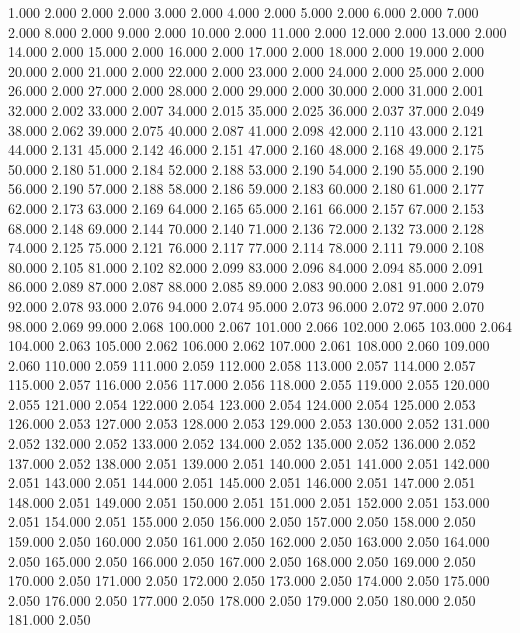 1.000 2.000 
2.000 2.000 
3.000 2.000 
4.000 2.000 
5.000 2.000 
6.000 2.000 
7.000 2.000 
8.000 2.000 
9.000 2.000 
10.000 2.000 
11.000 2.000 
12.000 2.000 
13.000 2.000 
14.000 2.000 
15.000 2.000 
16.000 2.000 
17.000 2.000 
18.000 2.000 
19.000 2.000 
20.000 2.000 
21.000 2.000 
22.000 2.000 
23.000 2.000 
24.000 2.000 
25.000 2.000 
26.000 2.000 
27.000 2.000 
28.000 2.000 
29.000 2.000 
30.000 2.000 
31.000 2.001 
32.000 2.002 
33.000 2.007 
34.000 2.015 
35.000 2.025 
36.000 2.037 
37.000 2.049 
38.000 2.062 
39.000 2.075 
40.000 2.087 
41.000 2.098 
42.000 2.110 
43.000 2.121 
44.000 2.131 
45.000 2.142 
46.000 2.151 
47.000 2.160 
48.000 2.168 
49.000 2.175 
50.000 2.180 
51.000 2.184 
52.000 2.188 
53.000 2.190 
54.000 2.190 
55.000 2.190 
56.000 2.190 
57.000 2.188 
58.000 2.186 
59.000 2.183 
60.000 2.180 
61.000 2.177 
62.000 2.173 
63.000 2.169 
64.000 2.165 
65.000 2.161 
66.000 2.157 
67.000 2.153 
68.000 2.148 
69.000 2.144 
70.000 2.140 
71.000 2.136 
72.000 2.132 
73.000 2.128 
74.000 2.125 
75.000 2.121 
76.000 2.117 
77.000 2.114 
78.000 2.111 
79.000 2.108 
80.000 2.105 
81.000 2.102 
82.000 2.099 
83.000 2.096 
84.000 2.094 
85.000 2.091 
86.000 2.089 
87.000 2.087 
88.000 2.085 
89.000 2.083 
90.000 2.081 
91.000 2.079 
92.000 2.078 
93.000 2.076 
94.000 2.074 
95.000 2.073 
96.000 2.072 
97.000 2.070 
98.000 2.069 
99.000 2.068 
100.000 2.067 
101.000 2.066 
102.000 2.065 
103.000 2.064 
104.000 2.063 
105.000 2.062 
106.000 2.062 
107.000 2.061 
108.000 2.060 
109.000 2.060 
110.000 2.059 
111.000 2.059 
112.000 2.058 
113.000 2.057 
114.000 2.057 
115.000 2.057 
116.000 2.056 
117.000 2.056 
118.000 2.055 
119.000 2.055 
120.000 2.055 
121.000 2.054 
122.000 2.054 
123.000 2.054 
124.000 2.054 
125.000 2.053 
126.000 2.053 
127.000 2.053 
128.000 2.053 
129.000 2.053 
130.000 2.052 
131.000 2.052 
132.000 2.052 
133.000 2.052 
134.000 2.052 
135.000 2.052 
136.000 2.052 
137.000 2.052 
138.000 2.051 
139.000 2.051 
140.000 2.051 
141.000 2.051 
142.000 2.051 
143.000 2.051 
144.000 2.051 
145.000 2.051 
146.000 2.051 
147.000 2.051 
148.000 2.051 
149.000 2.051 
150.000 2.051 
151.000 2.051 
152.000 2.051 
153.000 2.051 
154.000 2.051 
155.000 2.050 
156.000 2.050 
157.000 2.050 
158.000 2.050 
159.000 2.050 
160.000 2.050 
161.000 2.050 
162.000 2.050 
163.000 2.050 
164.000 2.050 
165.000 2.050 
166.000 2.050 
167.000 2.050 
168.000 2.050 
169.000 2.050 
170.000 2.050 
171.000 2.050 
172.000 2.050 
173.000 2.050 
174.000 2.050 
175.000 2.050 
176.000 2.050 
177.000 2.050 
178.000 2.050 
179.000 2.050 
180.000 2.050 
181.000 2.050 
